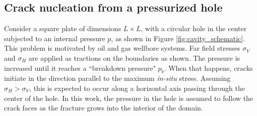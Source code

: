 \subsection{Crack nucleation from a pressurized hole}

Consider a square plate of dimensions $L \times L$, with a circular hole in the center subjected to an internal pressure $p$, as shown in Figure \ref{fig:cavity_schematic}. This problem is motivated by oil and gas wellbore systems.   Far field stresses $\sigma_V$ and $\sigma_H$ are applied as tractions on the boundaries as shown. 
The pressure is increased until it reaches a ``breakdown pressure" $p_b$. When that happens, cracks initiate in the direction parallel to the maximum \textit{in-situ} stress. Assuming $\sigma_H > \sigma_V$, this is expected to occur along a horizontal axis passing through the center of the hole.  In this work, the pressure in the hole is assumed to follow the crack faces as the fracture grows into the interior of the domain.  


